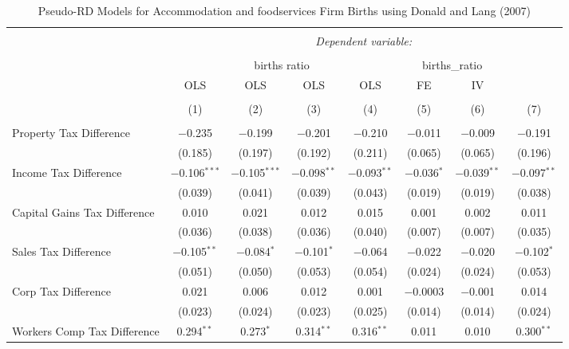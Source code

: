 
\begin{table}[!htbp] \centering 
  \caption{Pseudo-RD Models for  Accommodation and foodservices Firm Births using Donald and Lang (2007)} 
  \label{} 
\begin{tabular}{@{\extracolsep{5pt}}lccccccc} 
\\[-1.8ex]\hline 
\hline \\[-1.8ex] 
 & \multicolumn{7}{c}{\textit{Dependent variable:}} \\ 
\cline{2-8} 
\\[-1.8ex] & \multicolumn{4}{c}{births ratio} & \multicolumn{2}{c}{births\_ratio} &   \\ 
 & OLS & OLS & OLS & OLS & FE & IV &  \\ 
\\[-1.8ex] & (1) & (2) & (3) & (4) & (5) & (6) & (7)\\ 
\hline \\[-1.8ex] 
 Property Tax Difference & $-$0.235 & $-$0.199 & $-$0.201 & $-$0.210 & $-$0.011 & $-$0.009 & $-$0.191 \\ 
  & (0.185) & (0.197) & (0.192) & (0.211) & (0.065) & (0.065) & (0.196) \\ 
  Income Tax Difference & $-$0.106$^{***}$ & $-$0.105$^{***}$ & $-$0.098$^{**}$ & $-$0.093$^{**}$ & $-$0.036$^{*}$ & $-$0.039$^{**}$ & $-$0.097$^{**}$ \\ 
  & (0.039) & (0.041) & (0.039) & (0.043) & (0.019) & (0.019) & (0.038) \\ 
  Capital Gains Tax Difference & 0.010 & 0.021 & 0.012 & 0.015 & 0.001 & 0.002 & 0.011 \\ 
  & (0.036) & (0.038) & (0.036) & (0.040) & (0.007) & (0.007) & (0.035) \\ 
  Sales Tax Difference & $-$0.105$^{**}$ & $-$0.084$^{*}$ & $-$0.101$^{*}$ & $-$0.064 & $-$0.022 & $-$0.020 & $-$0.102$^{*}$ \\ 
  & (0.051) & (0.050) & (0.053) & (0.054) & (0.024) & (0.024) & (0.053) \\ 
  Corp Tax Difference & 0.021 & 0.006 & 0.012 & 0.001 & $-$0.0003 & $-$0.001 & 0.014 \\ 
  & (0.023) & (0.024) & (0.023) & (0.025) & (0.014) & (0.014) & (0.024) \\ 
  Workers Comp Tax Difference & 0.294$^{**}$ & 0.273$^{*}$ & 0.314$^{**}$ & 0.316$^{**}$ & 0.011 & 0.010 & 0.300$^{**}$ \\ 

\end{tabular}
\end{table}
